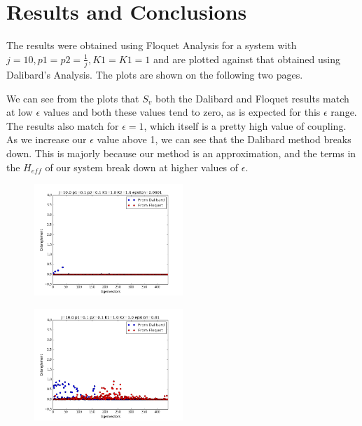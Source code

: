 
\chapter{Results and Conclusions} %

\label{Chapter3} %



The results were obtained using Floquet Analysis for a system with $j=10, p1=p2=\frac{1}{j}, K1=K1=1$ and are plotted against that obtained using Dalibard's Analysis. The plots are shown on the following two pages.

We can see from the plots that $S_v$ both the Dalibard and Floquet results match at low $\epsilon$ values and both these values tend to zero, as is expected for this $\epsilon$ range. The results also match for $\epsilon = 1$, which itself is a pretty high value of coupling. As we increase our $\epsilon$ value above 1, we can see that the Dalibard method breaks down. This is majorly because our method is an approximation, and the terms in the $H_{eff}$ of our system break down at higher values of $\epsilon$.

\begin{figure}[p]
\centering
\includegraphics[width=0.5\textwidth]{Figures/epsilon_0_0001.png}
\end{figure}

\begin{figure}[p]
\centering
\includegraphics[width=0.5\textwidth]{Figures/epsilon_0_01.png}
\end{figure}

